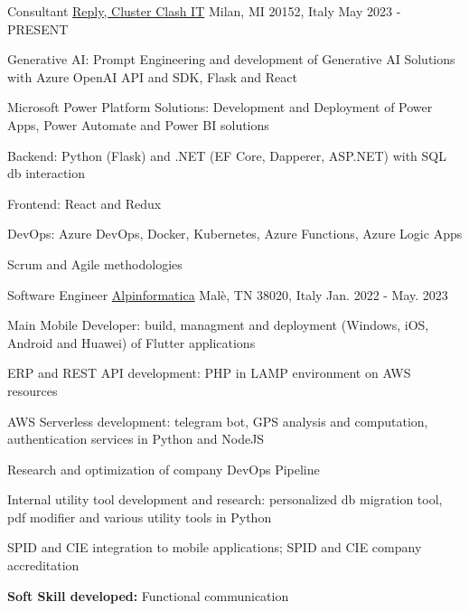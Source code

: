 

\begin{cventries}

  \cventry
    {Consultant} %
    {\href{www.reply.com/}{Reply, Cluster Clash IT}} %
    {Milan, MI 20152, Italy} %
    {May 2023 - PRESENT} %
    {
       \begin{cvitems} %
        \item {Generative AI: Prompt Engineering and development of Generative AI Solutions with Azure OpenAI API and SDK, Flask and React}
        \item {Microsoft Power Platform Solutions: Development and Deployment of Power Apps, Power Automate and Power BI solutions}
        \item {Backend: Python (Flask) and .NET (EF Core, Dapperer, ASP.NET) with SQL db interaction}
        \item {Frontend: React and Redux}
        \item {DevOps: Azure DevOps, Docker, Kubernetes, Azure Functions, Azure Logic Apps}
        \item {Scrum and Agile methodologies}
       \end{cvitems}
    }

  \cventry
    {Software Engineer} %
    {\href{https://www.alpinformatica.com/}{Alpinformatica}} %
    {Malè, TN 38020, Italy} %
    {Jan. 2022 - May. 2023} %
    {
      \begin{cvitems} %
        \item {Main Mobile Developer: build, managment and deployment (Windows, iOS, Android and Huawei) of Flutter applications}
        \item {ERP and REST API development: PHP in LAMP environment on AWS resources}
        \item {AWS Serverless development: telegram bot, GPS analysis and computation, authentication services in Python and NodeJS}
        \item {Research and optimization of company DevOps Pipeline}
        \item {Internal utility tool development and research: personalized db migration tool, pdf modifier and various utility tools in Python}
        \item {SPID and CIE integration to mobile applications; SPID and CIE company accreditation}
        \item {\textbf{Soft Skill developed:} Functional communication}
      \end{cvitems}
    }


\end{cventries}
